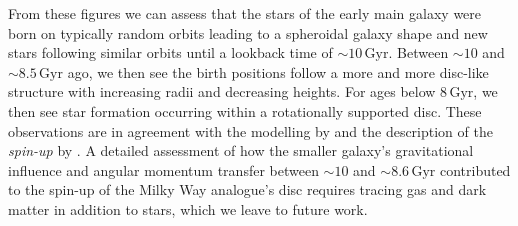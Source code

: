 \documentclass[fleqn,usenatbib]{mnras}
\begin{document}
From these figures we can assess that the stars of the early main galaxy were born on typically random orbits leading to a spheroidal galaxy shape and new stars following similar orbits until a lookback time of $\sim 10\,\mathrm{Gyr}$. Between $\sim10$ and $\sim 8.5\,\mathrm{Gyr}$ ago, we then see the birth positions follow a more and more disc-like structure with increasing radii and decreasing heights. For ages below $8\,\mathrm{Gyr}$, we then see star formation occurring within a rotationally supported disc. These observations are in agreement with the modelling by \citet{MCM2013} and the description of the \textit{spin-up} by \citet{Belokurov2022}. A detailed assessment of how the smaller galaxy’s gravitational influence and angular momentum transfer between $\sim10$ and $\sim8.6\,\mathrm{Gyr}$ contributed to the spin-up of the Milky Way analogue’s disc requires tracing gas and dark matter in addition to stars, which we leave to future work.
\end{document}
